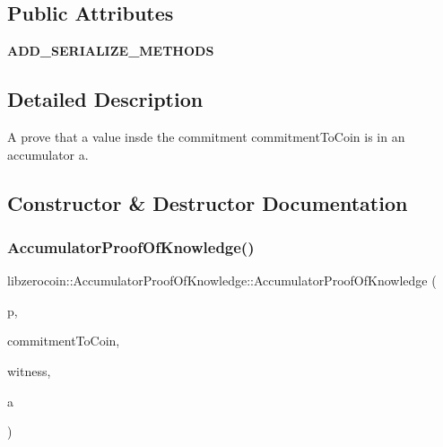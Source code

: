 \subsection*{Public Attributes}
\begin{DoxyCompactItemize}
\item 
\mbox{\label{classlibzerocoin_1_1_accumulator_proof_of_knowledge_aeebe0feccb9cc047063f279a369f0161}} 
{\bfseries A\+D\+D\+\_\+\+S\+E\+R\+I\+A\+L\+I\+Z\+E\+\_\+\+M\+E\+T\+H\+O\+DS}
\end{DoxyCompactItemize}


\subsection{Detailed Description}
A prove that a value insde the commitment commitment\+To\+Coin is in an accumulator a. 

\subsection{Constructor \& Destructor Documentation}
\mbox{\label{classlibzerocoin_1_1_accumulator_proof_of_knowledge_acce987e79e2498918495c3a7e8873810}} 
\subsubsection{\texorpdfstring{Accumulator\+Proof\+Of\+Knowledge()}{AccumulatorProofOfKnowledge()}}
{\footnotesize\ttfamily libzerocoin\+::\+Accumulator\+Proof\+Of\+Knowledge\+::\+Accumulator\+Proof\+Of\+Knowledge (\begin{DoxyParamCaption}\item[{const \mbox{\hyperlink{classlibzerocoin_1_1_accumulator_and_proof_params}{Accumulator\+And\+Proof\+Params}} $\ast$}]{p,  }\item[{const \mbox{\hyperlink{classlibzerocoin_1_1_commitment}{Commitment}} \&}]{commitment\+To\+Coin,  }\item[{const \mbox{\hyperlink{classlibzerocoin_1_1_accumulator_witness}{Accumulator\+Witness}} \&}]{witness,  }\item[{\mbox{\hyperlink{classlibzerocoin_1_1_accumulator}{Accumulator}} \&}]{a }\end{DoxyParamCaption})}

